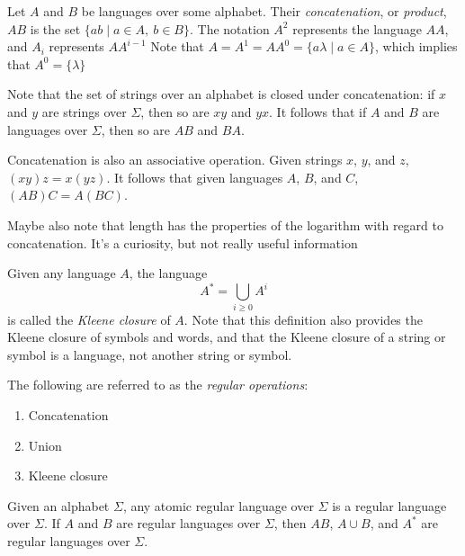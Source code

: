 \documentclass{bcthesis}
\renewcommand{\meo}{}
\newcommand{\footcite}[2]{\footnote{\cite[pg.~{#2}]{#1}}}
\renewcommand{\footcite}[2]{\cite[pg.~{#2}]{#1}}
\begin{document}
	\begin{definition}
		Let $A$ and $B$ be languages over some alphabet.
		Their \textit{concatenation}, or \textit{product}, $AB$ is the set $\{ ab \mid a \in A, \ b \in B \}$.
		The notation $A^2$ represents the language $AA$, and $A_i$ represents $AA^{i-1}$
		Note that $A = A^1 = AA^0 = \{ a \lambda \mid a \in A \}$, which implies that $A^0 = \{ \lambda \}$
	\end{definition}

	\begin{remark}
		Note that the set of strings over an alphabet is closed under concatenation: if $x$ and $y$ are strings over $\Sigma$, then so are $xy$ and $yx$.
		It follows that if $A$ and $B$ are languages over $\Sigma$, then so are $AB$ and $BA$.
		
		Concatenation is also an associative operation.
		Given strings $x$, $y$, and $z$, $(xy)z = x(yz)$.
		It follows that given languages $A$, $B$, and $C$, $(AB)C = A(BC)$.

		\meo{
			Maybe also note that length has the properties of the logarithm with regard to concatenation.
			It's a curiosity, but not really useful information
		}
	\end{remark}

	\begin{definition}
		Given any language $A$, the language 
		\[
			A^* = \bigcup_{i \geq 0} A^i
		\]
		is called the \textit{Kleene closure} of $A$.\footcite{lemmings}{3}
		Note that this definition also provides the Kleene closure of symbols and words, and that the Kleene closure of a string or symbol is a language, not another string or symbol.
	\end{definition}

	\begin{definition}
		The following are referred to as the \textit{regular operations}:
		\begin{enumerate}[label=(\roman*), itemsep = -0.3 ex]
			\item Concatenation
			\item Union
			\item Kleene closure
		\end{enumerate}
	\end{definition}

	\begin{definition}
		Given an alphabet $\Sigma$, any atomic regular language over $\Sigma$ is a regular language over $\Sigma$.
		If $A$ and $B$ are regular languages over $\Sigma$, then $AB$, $A \cup B$, and $A^*$ are regular languages over $\Sigma$.
	\end{definition}
\end{document}
